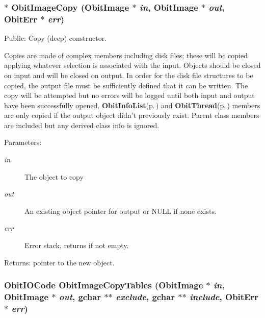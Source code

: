 \subsubsection{$\ast$ Obit\-Image\-Copy ({\bf Obit\-Image} $\ast$ {\em in}, {\bf Obit\-Image} $\ast$ {\em out}, {\bf Obit\-Err} $\ast$ {\em err})}\label{ObitImage_8c_a16}


Public: Copy (deep) constructor. 

Copies are made of complex members including disk files; these will be copied applying whatever selection is associated with the input. Objects should be closed on input and will be closed on output. In order for the disk file structures to be copied, the output file must be sufficiently defined that it can be written. The copy will be attempted but no errors will be logged until both input and output have been successfully opened. {\bf Obit\-Info\-List}{\rm (p.\,\pageref{structObitInfoList})} and {\bf Obit\-Thread}{\rm (p.\,\pageref{structObitThread})} members are only copied if the output object didn't previously exist. Parent class members are included but any derived class info is ignored. \begin{Desc}
\item[Parameters:]
\begin{description}
\item[{\em in}]The object to copy \item[{\em out}]An existing object pointer for output or NULL if none exists. \item[{\em err}]Error stack, returns if not empty. \end{description}
\end{Desc}
\begin{Desc}
\item[Returns:]pointer to the new object. \end{Desc}
\subsubsection{\setlength{\rightskip}{0pt plus 5cm}Obit\-IOCode Obit\-Image\-Copy\-Tables ({\bf Obit\-Image} $\ast$ {\em in}, {\bf Obit\-Image} $\ast$ {\em out}, gchar $\ast$$\ast$ {\em exclude}, gchar $\ast$$\ast$ {\em include}, {\bf Obit\-Err} $\ast$ {\em err})}\label{ObitImage_8c_a29}


